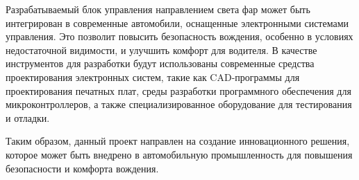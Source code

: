 Разрабатываемый блок управления направлением света фар может быть интегрирован в современные автомобили, оснащенные электронными системами управления. Это позволит повысить безопасность вождения, особенно в условиях недостаточной видимости, и улучшить комфорт для водителя. В качестве инструментов для разработки будут использованы современные средства проектирования электронных систем, такие как CAD-программы для проектирования печатных плат, среды разработки программного обеспечения для микроконтроллеров, а также специализированное оборудование для тестирования и отладки.

Таким образом, данный проект направлен на создание инновационного решения, которое может быть внедрено в автомобильную промышленность для повышения безопасности и комфорта вождения.
